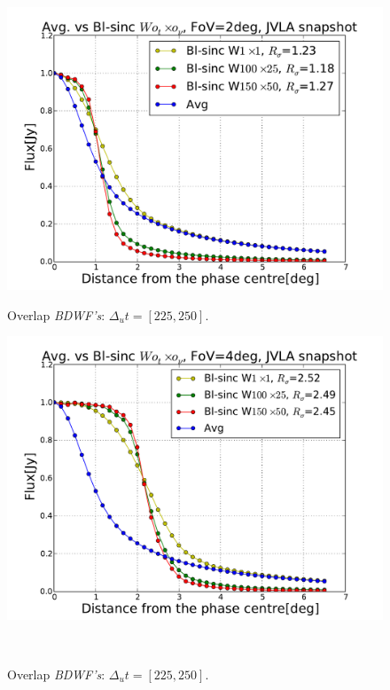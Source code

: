 \documentclass[useAMS,usenatbib]{mn2e}
\begin{document}
\begin{figure}
  \centering
\begin{minipage}{0.45\linewidth}\includegraphics[width=1\textwidth]{./Figures/Bl-sinc-FoV2-vla.pdf}\caption{Overlap 
		\textit{BDWF's}: $\Delta_u t= [225, 250]$.}\label{fig:Bl-sinc-FoV2}\end{minipage}
\begin{minipage}{0.45\linewidth}\includegraphics[width=1\textwidth]{./Figures/Bl-sinc-FoV4-vla.pdf}\caption{Overlap 
		\textit{BDWF's}: $\Delta_u t= [225, 250]$.}\label{fig:Bl-sinc-FoV4}\end{minipage}\\

\end{figure}
\end{document}
